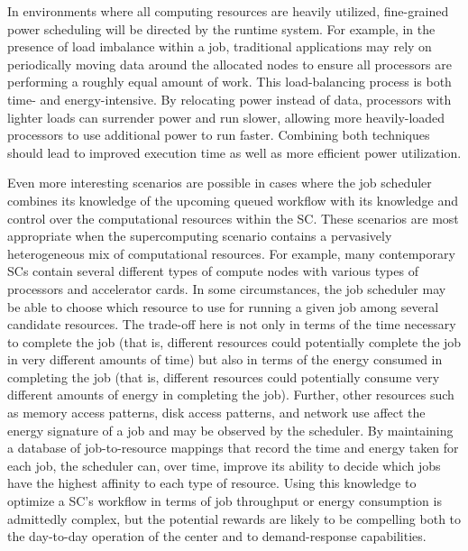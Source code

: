 In environments where all computing resources are heavily utilized,
fine-grained power scheduling will be directed by the runtime system.
For example, in the presence of load imbalance within a job, traditional
applications may rely on periodically moving data around the allocated
nodes to ensure all processors are performing a roughly equal amount
of work. This load-balancing process is both time- and energy-intensive.
By relocating power instead of data, processors with lighter loads can
surrender power and run slower, allowing more heavily-loaded processors
to use additional power to run faster. Combining both techniques 
should lead to improved execution time as well as more efficient
power utilization.

Even more interesting scenarios are possible in cases where the job
scheduler combines its knowledge of the upcoming queued workflow with
its knowledge and control over the computational resources within the
SC. These scenarios are most appropriate when the
supercomputing scenario contains a pervasively heterogeneous mix of
computational resources. For example, many contemporary SCs contain several different types of compute nodes with various
types of processors and accelerator cards. In some circumstances, the
job scheduler may be able to choose which resource to use for running
a given job among several candidate resources. The trade-off here is
not only in terms of the time necessary to complete the job (that is,
different resources could potentially complete the job in very
different amounts of time) but also in terms of the energy consumed in
completing the job (that is, different resources could potentially
consume very different amounts of energy in completing the job).
Further, other resources such as memory access patterns, disk access
patterns, and network use affect the energy signature of a job and may
be observed by the scheduler. By maintaining a database of
job-to-resource mappings that record the time and energy taken for
each job, the scheduler can, over time, improve its ability to decide
which jobs have the highest affinity to each type of resource. Using
this knowledge to optimize a SC's workflow in terms
of job throughput or energy consumption is admittedly complex, but the
potential rewards are likely to be compelling both to the day-to-day
operation of the center and to demand-response capabilities.

